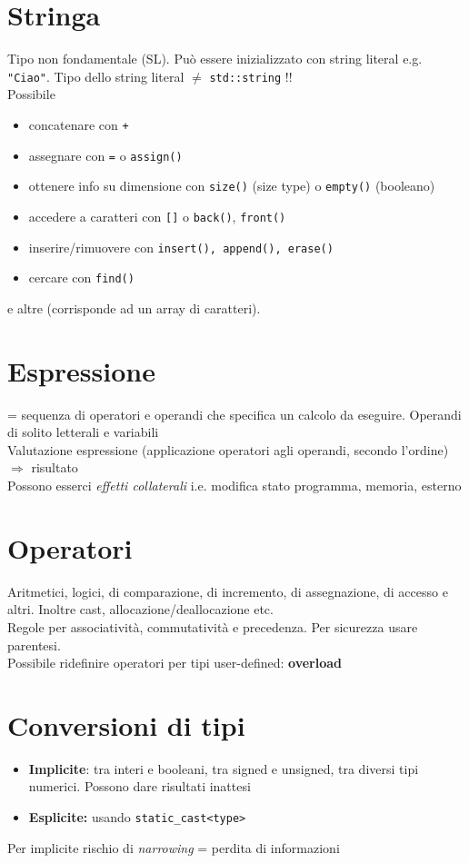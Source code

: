 \documentclass[10pt, oneside]{book}
\begin{document}
\section{Stringa}
Tipo non fondamentale (SL). Può essere inizializzato con string literal e.g. \texttt{"Ciao"}. Tipo dello string literal $\neq$ \texttt{std::string} !!\\
Possibile 
\begin{itemize}
\item concatenare con \texttt{+}
\item assegnare con \texttt{=} o \texttt{assign()}
\item ottenere info su dimensione con \texttt{size()} (size type) o \texttt{empty()} (booleano)
\item accedere a caratteri con \texttt{[]} o \texttt{back()}, \texttt{front()}
\item inserire/rimuovere con \texttt{insert(), append(), erase()}
\item cercare con \texttt{find()}
\end{itemize}
e altre (corrisponde ad un array di caratteri).


\section{Espressione}
= sequenza di operatori e operandi che specifica un calcolo da eseguire. Operandi di solito letterali e variabili\\
Valutazione espressione (applicazione operatori agli operandi, secondo l'ordine) $\Rightarrow$ risultato\\
Possono esserci \textit{effetti collaterali} i.e. modifica stato programma, memoria, esterno

\section{Operatori}
Aritmetici, logici, di comparazione, di incremento, di assegnazione, di accesso e altri. Inoltre cast, allocazione/deallocazione etc.\\
Regole per associatività, commutatività e precedenza. Per sicurezza usare parentesi.\\Possibile ridefinire operatori per tipi user-defined: \textbf{overload}

\section{Conversioni di tipi}
\begin{itemize}
\item \textbf{Implicite}: tra interi e booleani, tra signed e unsigned, tra diversi tipi numerici. Possono dare risultati inattesi
\item \textbf{Esplicite:} usando \texttt{static\_cast<type>}
\end{itemize}
Per implicite rischio di \textit{narrowing} = perdita di informazioni
\end{document}

